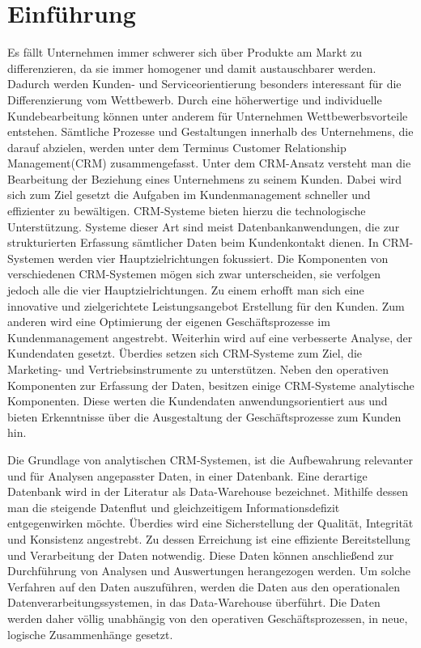 
\chapter{Einführung}

Es fällt Unternehmen immer schwerer sich über Produkte am Markt zu differenzieren, da sie immer homogener und damit austauschbarer werden. Dadurch werden Kunden- und Serviceorientierung besonders interessant für die Differenzierung vom Wettbewerb. Durch eine höherwertige und individuelle Kundebearbeitung können unter anderem für Unternehmen Wettbewerbsvorteile entstehen. Sämtliche Prozesse und Gestaltungen innerhalb des Unternehmens, die darauf abzielen, werden unter dem Terminus Customer Relationship Management(CRM) zusammengefasst. Unter dem CRM-Ansatz versteht man die Bearbeitung der Beziehung eines Unternehmens zu seinem Kunden. Dabei wird sich zum Ziel gesetzt die Aufgaben im Kundenmanagement schneller und effizienter zu bewältigen. CRM-Systeme bieten hierzu die technologische Unterstützung. Systeme dieser Art sind meist Datenbankanwendungen, die zur strukturierten Erfassung sämtlicher Daten beim Kundenkontakt dienen. In CRM-Systemen werden vier Hauptzielrichtungen fokussiert. Die Komponenten von verschiedenen CRM-Systemen mögen sich zwar unterscheiden, sie verfolgen jedoch alle die vier Hauptzielrichtungen. Zu einem erhofft man sich eine innovative und zielgerichtete Leistungsangebot Erstellung für den Kunden. Zum anderen wird eine Optimierung der eigenen Geschäftsprozesse im Kundenmanagement angestrebt. Weiterhin wird auf eine verbesserte Analyse, der Kundendaten gesetzt. Überdies setzen sich CRM-Systeme zum Ziel, die Marketing- und Vertriebsinstrumente zu unterstützen. Neben den operativen Komponenten zur Erfassung der Daten, besitzen einige CRM-Systeme analytische Komponenten. Diese werten die Kundendaten anwendungsorientiert aus und bieten Erkenntnisse über die Ausgestaltung der Geschäftsprozesse zum Kunden hin.

Die Grundlage von analytischen CRM-Systemen, ist die Aufbewahrung relevanter und für Analysen angepasster Daten, in einer Datenbank. Eine derartige Datenbank wird in der Literatur als Data-Warehouse bezeichnet. Mithilfe dessen man die steigende Datenflut und gleichzeitigem Informationsdefizit entgegenwirken möchte. Überdies wird eine Sicherstellung der Qualität, Integrität und Konsistenz angestrebt. Zu dessen Erreichung ist eine effiziente Bereitstellung und Verarbeitung der Daten notwendig. Diese Daten können anschließend zur Durchführung von Analysen und Auswertungen herangezogen werden. Um solche Verfahren auf den Daten auszuführen, werden die Daten aus den operationalen Datenverarbeitungssystemen, in das Data-Warehouse überführt. Die Daten werden daher völlig unabhängig von den operativen Geschäftsprozessen, in neue, logische Zusammenhänge gesetzt. 

